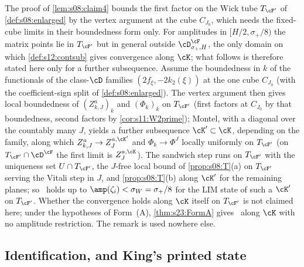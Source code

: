 \begin{remark}[amplitudes in $[H/2,\sigma_+/8)$: the route through the fixed-cube limits, for a further subsequence]\label{rem:s12:amplitudes}
The proof of \cref{lem:s08:claim4} bounds the first factor on the Wick tube $T_{\cF'}$ of \cref{def:s08:enlarged} by the vertex argument at the cube $C_{J_0}$, which needs the fixed-cube limits in their boundedness form only. For amplitudes in $[H/2,\sigma_+/8)$ the matrix points lie in $T_{\cF'}$ but in general outside $\cD^{\cF}_{\sigma_+,H}$, the only domain on which \cref{def:s12:contsub} gives convergence along $\cK$; what follows is therefore stated here only for a further subsequence. Assume the boundedness in $k$ of the functionals of the class-$\cD$ families $(2f_\xi,-2k_2(\xi))$ at the one cube $C_{J_0}$ (with the coefficient-sign split of \cref{def:s08:enlarged}). The vertex argument then gives local boundedness of $(Z^a_{k,J})_k$ and $(\Phi_k)_k$ on $T_{\cF'}$ (first factors at $C_{J_0}$ by that boundedness, second factors by \cref{cor:s11:W2prime}); Montel, with a diagonal over the countably many $J$, yields a further subsequence $\cK'\subset\cK$, depending on the family, along which $Z^a_{k,J}\to Z^{a,\cK'}_J$ and $\Phi_k\to\Phi^J$ locally uniformly on $T_{\cF'}$ (on $T_{\cF'}\cap\cD^\cF$ the first limit is $Z^{a,\cK}_J$). The sandwich step runs on $T_{\cF'}$ with the uniqueness set $U\cap T_{\cF'}$, the $J$-free local bound of \cref{prop:s08:T}(a) on $T_{\cF'}$ serving the Vitali step in $J$, and \cref{prop:s08:T}(b) along $\cK'$ for the remaining planes; so \OSt\ holds up to $\amp(\zeta_i)<\sigma_W=\sigma_+/8$ for the LIM state of such a $\cK'$ on $T_{\cF'}$. Whether the convergence holds along $\cK$ itself on $T_{\cF'}$ is not claimed here; under the hypotheses of Form~(A), \cref{thm:s23:FormA} gives \OSt\ along $\cK$ with no amplitude restriction. The remark is used nowhere else.
\end{remark}

\subsection{Identification, and King's printed state}

